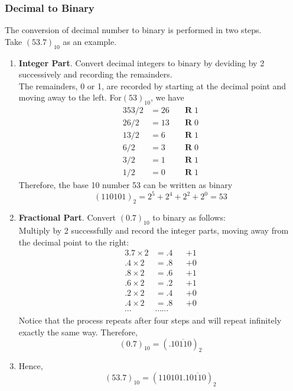 \documentclass[12pt]{article}
\theoremstyle{definition}
\DeclareMathOperator{\R}{\mathbf{R}}
\begin{document}
\subsubsection{Decimal to Binary}
The conversion of decimal number to binary is performed in two steps.\\
Take $(53.7)_{10}$ as an example.
\begin{enumerate}
  \item \textbf{Integer Part}. Convert decimal integers to binary by deviding by 2 successively and recording the remainders. \\The remainders, 0 or 1, are recorded by starting at the decimal point and moving away to the left. For$ (53)_{10}$, we have
  \begin{alignat*}{3}
    53/2 &= 26 &&\R 1\\
    26/2 &= 13 &&\R 0\\
    13/2 &= 6 &&\R 1\\
    6/2 &=3&&\R 0\\
    3/2 &= 1&&\R 1\\
    1/2 &= 0&&\R 1
  \end{alignat*}
  Therefore, the base 10 number 53 can be written as binary
  \[
(110101)_2 = 2^5+2^4+2^2+2^0 = 53
  \]
  \item \textbf{Fractional Part}. Convert $(0.7)_{10}$ to binary as follows: \\Multiply by 2 successfully and record the integer parts, moving away from the decimal point to the right:
  \begin{alignat*}{3}
    .7\times2 &= .4 &&+ 1\\
    .4\times2 &= .8 &&+ 0\\
    .8\times2 &= .6 &&+ 1\\
    .6\times2 &=.2&&+ 1\\
    .2\times2 &= .4&&+ 0\\
    .4\times2 &= .8&&+ 0\\
    \cdots&\cdots\cdots&& 
  \end{alignat*}
  Notice that the process repeats after four steps and will repeat infinitely exactly the same way. Therefore,
  \[
(0.7)_{10} = (.1\overline{0110})_2
  \]
  \item Hence,
  \[
(53.7)_{10} = (110101.1\overline{0110})_2
  \]
\end{enumerate}
\end{document}
